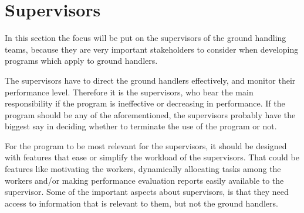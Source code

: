 \section{Supervisors}
In this section the focus will be put on the supervisors of the ground handling teams, because they are very important stakeholders to consider when developing programs which apply to ground handlers.

The supervisors have to direct the ground handlers effectively, and monitor their performance level. Therefore it is the supervisors, who bear the main responsibility if the program is ineffective or decreasing in performance. If the program should be any of the aforementioned, the supervisors probably have the biggest say in deciding whether to terminate the use of the program or not.

For the program to be most relevant for the supervisors, it should be designed with features that ease or simplify the workload of the supervisors. That could be features like motivating the workers, dynamically allocating tasks among the workers and/or making performance evaluation reports easily available to the supervisor.
Some of the important aspects about supervisors, is that they need access to information that is relevant to them, but not the ground handlers.
